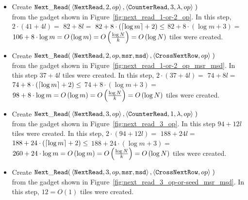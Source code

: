 \begin{itemize}
    \item Create
    $\begin{aligned}[t]
        \nextread(& \left\langle {\tt NextRead},    2,          \inc \right\rangle,
                    \left\langle {\tt CounterRead}, 3, \lambda, \inc \right\rangle \;)
    \end{aligned}$\\from the gadget shown in Figure~\ref{fig:next_read_1-or-2_op}.
    In this step, $2 \cdot \left( 41 + 4l \right) =$
    $82 + 8l =$
    $82 + 8 \cdot \left( \ceil*{\log m} + 2 \right) \leq$
    $82 + 8 \cdot \left( {\log m} + 3 \right) =$
    $106 + 8 \cdot {\log m} = \bigologm$ tiles were created.
    \vspace{0.5cm}

    \item Create
    $\begin{aligned}[t]
        \nextread(& \left\langle {\tt NextRead}, 2,  \inc, {\tt msr}, {\tt msd} \right\rangle,
                    \left\langle {\tt CrossNextRow}, \inc                       \right\rangle \;)
    \end{aligned}$\\from the gadget shown in Figure~\ref{fig:next_read_1-or-2_op_msr_msd}. In this step $37 + 4l$ tiles were created.
    In this step, $2 \cdot \left( 37 + 4l \right) =$
    $74 + 8l =$
    $74 + 8 \cdot \left( \ceil*{\log m} + 2 \right) \leq$
    $74 + 8 \cdot \left( {\log m} + 3 \right) =$
    $98 + 8 \cdot {\log m} = \bigologm$ tiles were created.
    \vspace{0.5cm}

    \item Create
    $\begin{aligned}[t]
        \nextread(& \left\langle {\tt NextRead},    3,          \inc \right\rangle,
                    \left\langle {\tt CounterRead}, 1, \lambda, \inc \right\rangle \;)
    \end{aligned}$\\from the gadget shown in Figure~\ref{fig:next_read_3_op}. In this step $94 + 12l$ tiles were created.
    In this step, $2 \cdot \left( 94 + 12l \right) =$
    $188 + 24l =$
    $188 + 24 \cdot \left( \ceil*{\log m} + 2 \right) \leq$
    $188 + 24 \cdot \left( {\log m} + 3 \right) =$
    $260 + 24 \cdot {\log m} = \bigologm$ tiles were created.
    \vspace{0.5cm}

    \item Create
    $\begin{aligned}[t]
        \nextread(& \left\langle {\tt NextRead}, 3,  \inc, {\tt msr}, {\tt msd} \right\rangle,
                    \left\langle {\tt CrossNextRow}, \inc \right\rangle \;)
    \end{aligned}$\\from the gadget shown in Figure~\ref{fig:next_read_3_op-or-seed_msr_msd}.
    In this step, $12 = O\left( 1 \right)$ tiles were created.
\end{itemize}

